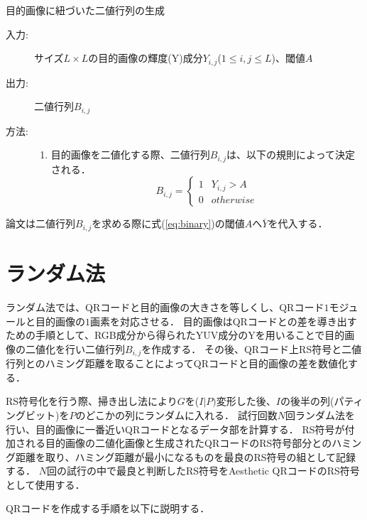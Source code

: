 \documentclass{thesis}
\begin{document}
\begin{algorithm}                      
\caption{目的画像に紐づいた二値行列の生成}         
\label{alg:alg2} 
\begin{description}
\item[入力:] サイズ$L \times L$の目的画像の輝度(Y)成分$Y_{i,j}$($1 \leq i,j \leq L$)、閾値$A$
\item[出力:] 二値行列$B_{i,j}$
\item[方法:]
\begin{enumerate}
\item 目的画像を二値化する際、二値行列$B_{i,j}$は、以下の規則によって決定される．
\begin{equation}
{B_{i,j} =}
\begin{cases}
1 & Y_{i,j} > A \\
0 & otherwise 
\end{cases}
\label{eq:binary}
\end{equation}
\end{enumerate}
\end{description}
\end{algorithm} 

論文\cite{KURI}は二値行列$B_{i,j}$を求める際に式(\ref{eq:binary})の閾値$A$へ$\overline{Y}$を代入する．


\newpage
\section{ランダム法}
ランダム法では、QRコードと目的画像の大きさを等しくし、QRコード$1$モジュールと目的画像の$1$画素を対応させる．
目的画像はQRコードとの差を導き出すための手順として、RGB成分から得られたYUV成分のYを用いることで目的画像の二値化を行い二値行列$B_{i,j}$を作成する．
その後、QRコード上RS符号と二値行列とのハミング距離を取ることによってQRコードと目的画像の差を数値化する．


RS符号化を行う際、掃き出し法により$G$を($I|P)$変形した後、$I$の後半の列(パティングビット)を$P$のどこかの列にランダムに入れる．
試行回数$N$回ランダム法を行い、目的画像に一番近いQRコードとなるデータ部を計算する．
RS符号が付加される目的画像の二値化画像と生成されたQRコードのRS符号部分とのハミング距離を取り、ハミング距離が最小になるものを最良のRS符号の組として記録する．
$N$回の試行の中で最良と判断したRS符号をAesthetic QRコードのRS符号として使用する．

\newpage
QRコードを作成する手順を以下に説明する．
\end{document}
